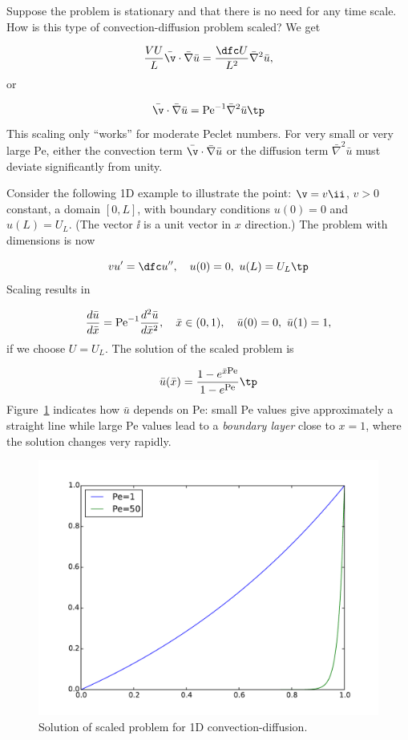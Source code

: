 \documentclass[graybox,envcountchap,sectrefs,final]{svmonodo}
\begin{document}
Suppose the problem is stationary and that there is no need for
any time scale. How is this type of convection-diffusion problem
scaled? We get

\[
\frac{VU}{L}\bar\v\cdot\bar\nabla\bar u =
\frac{\dfc U}{L^2}\bar\nabla^2\bar u,
\]
or

\begin{equation}
\bar\v\cdot\bar\nabla\bar u =
\hbox{Pe}^{-1}\bar\nabla^2\bar u\tp
\label{scale:convdiff:pde1:d3}
\end{equation}
This scaling only ``works'' for moderate Peclet numbers. For very small or
very large Pe, either the convection term $\bar\v\cdot\bar\nabla\bar u$
or the diffusion term $\bar\nabla^2\bar u$ must deviate significantly
from unity.

Consider the following 1D example to illustrate the point: $\v = v\ii$,
$v>0$ constant, a domain $[0,L]$, with boundary conditions $u(0)=0$ and
$u(L)=U_L$. (The vector $\ii$ is a unit vector in $x$ direction.)
The problem with dimensions is now

\[ vu^{\prime} = \dfc u^{\prime\prime},\quad u(0)=0,\ u(L)=U_L\tp\]
Scaling results in

\[ \frac{d\bar u}{d\bar x} = \hbox{Pe}^{-1}\frac{d^2\bar u}{d\bar x^2},\quad
\bar x\in (0,1),\quad \bar u(0)=0,\ \bar u(1) = 1,\]
if we choose $U=U_L$. The solution of the scaled problem is

\[ \bar u(\bar x) = \frac{1 - e^{\bar x\hbox{\footnotesize Pe}}}{1 - e^{\hbox{\footnotesize Pe}}}\tp\]
Figure~\ref{scale:convdiff:fig:scaled} indicates how $\bar u$ depends on
Pe: small Pe values give approximately a straight line while large Pe
values lead to a \emph{boundary layer} close to $x=1$, where the solution
changes very rapidly.


\begin{figure}[!ht]  %
  \centerline{\includegraphics[width=0.9\linewidth]{fig-scaling/boundary_layer1D.pdf}}
  \caption{
  Solution of scaled problem for 1D convection-diffusion. \label{scale:convdiff:fig:scaled}
  }
\end{figure}
\end{document}
